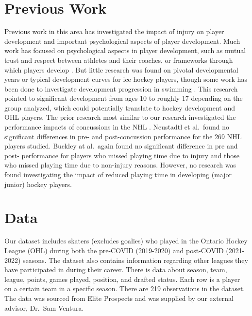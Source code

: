\documentclass[12pt]{article}
\begin{document}
\hypertarget{previous-work}{%
\section{Previous Work}\label{previous-work}}

Previous work in this area has investigated the impact of injury on
player development and important psychological aspects of player
development. Much work has focused on psychological aspects in player
development, such as mutual trust and respect between athletes and their
coaches, or frameworks through which players develop
\cite{lefebvre, soberlak}. But little research was found on pivotal
developmental years or typical development curves for ice hockey
players, though some work has been done to investigate development
progression in swimming \citet{born}. This research pointed to
significant development from ages 10 to roughly 17 depending on the
group analyzed, which could potentially translate to hockey development
and OHL players. The prior research most similar to our research
investigated the performance impacts of concussions in the NHL
\cite{buckley, neustadtl}. Neustadtl et al.~found no significant
differences in pre- and post-concussion performance for the 269 NHL
players studied. Buckley at al.~again found no significant difference in
pre and post- performance for players who missed playing time due to
injury and those who missed playing time due to non-injury reasons.
However, no research was found investigating the impact of reduced
playing time in developing (major junior) hockey players.

\hypertarget{data}{%
\section{Data}\label{data}}

Our dataset includes skaters (excludes goalies) who played in the
Ontario Hockey League (OHL) during both the pre-COVID (2019-2020) and
post-COVID (2021-2022) seasons. The dataset also contains information
regarding other leagues they have participated in during their career.
There is data about season, team, league, points, games played,
position, and drafted status. Each row is a player on a certain team in
a specific season. There are 219 observations in the dataset. The data
was sourced from Elite Prospects and was supplied by our external
advisor, Dr.~Sam Ventura.
\end{document}
